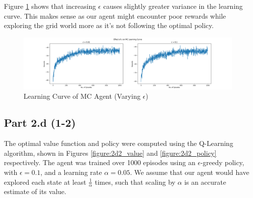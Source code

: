 \documentclass[12pt]{article}
\begin{document}
Figure \ref{figure:2c4_epsilon} shows that increasing \(\epsilon\) causes slightly greater variance in the learning curve. This makes sense as our agent might encounter poor rewards while exploring the grid world more as it's not following the optimal policy.

\begin{figure}[H]
    \centering
    \includegraphics[width=\textwidth]{figures/2c4_epsilon.png}
    \caption{Learning Curve of MC Agent (Varying \(\epsilon\))}
    \label{figure:2c4_epsilon}
\end{figure}

\subsection*{Part 2.d (1-2)}

The optimal value function and policy were computed using the Q-Learning algorithm, shown in Figures \ref{figure:2d2_value} and \ref{figure:2d2_policy} respectively. The agent was trained over 1000 episodes using an \(\epsilon\)-greedy policy, with \(\epsilon = 0.1\), and a learning rate \(\alpha = 0.05\). We assume that our agent would have explored each state at least \(\frac{1}{\alpha}\) times, such that scaling by \(\alpha\) is an accurate estimate of its value.
\end{document}
